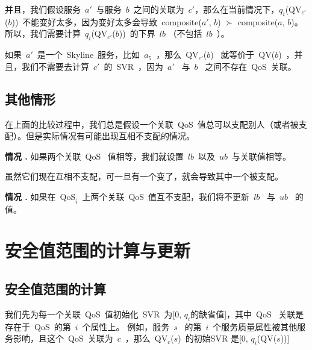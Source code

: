 并且，我们假设服务~$a'$~与服务~$b$~之间的关联为~$c'$，那么在当前情况下，$q_{i}$(QV$_{c'}$($b$))~不能变好太多，因为变好太多会导致~composite($a'$, $b$) $\succ$ composite($a$, $b$)。所以，我们需要计算~$q_{i}$(QV$_{c'}$($b$))~的下界~$lb$ （不包括~$lb$~）。

如果~$a'$~是一个~Skyline~服务，比如~$a_{5}$~，那么~QV$_{c'}$($b$)~ 就等价于~QV($b$)~，并且，我们不需要去计算~$c'$~的~SVR~，因为~$a'$~ 与~$b$~ 之间不存在~QoS~关联。

\subsection{其他情形}

在上面的比较过程中，我们总是假设一个关联~QoS~值总可以支配别人（或者被支配）。但是实际情况有可能出现互相不支配的情况。

\vspace{1.5pt}
\noindent\textbf{情况 \uppercase\expandafter{}.} 如果两个关联~QoS~ 值相等，我们就设置~$lb$~以及~$ub$~与关联值相等。
\vspace{1.5pt}

虽然它们现在互相不支配，可一旦有一个变了，就会导致其中一个被支配。

\vspace{1.5pt}
\noindent\textbf{情况 \uppercase\expandafter{}.}  如果在~QoS$_{\overline{i}}$~上两个关联~QoS~值互不支配，我们将不更新~$lb$~ 与~$ub$~ 的值。
\vspace{1.5pt}

\section{安全值范围的计算与更新}

\subsection{安全值范围的计算}

我们先为每一个关联~QoS~值初始化~SVR~为[0, $q_{i}$的缺省值]，其中~QoS~ 关联是存在于~QoS~的第~$i$~个属性上。 例如，服务~$s$~ 的第~$i$~个服务质量属性被其他服务影响，且这个~QoS~关联为~$c$~，那么~QV$_{c}$($s$)~的初始SVR 是[0, $q_{i}$(QV($s$))]

